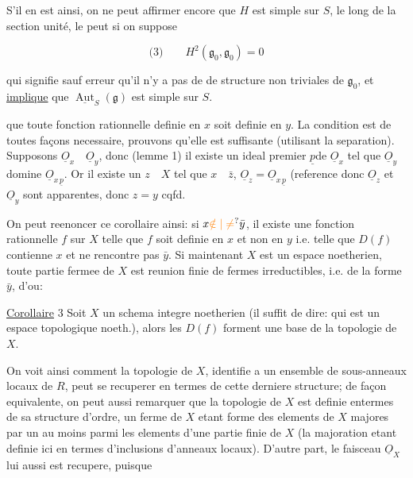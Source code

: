 S'il en est ainsi, on ne peut affirmer encore que \(H\) est simple sur \(S\), \unsure{\(=\)|\(\simeq\)} le long de la section unité,   le peut si on suppose

\[
\text{(3)}\qquad H^2(\mathfrak g_0,\mathfrak g_0)=0
\]

qui signifie sauf erreur qu'il n'y a pas de  de structure  non triviales de \(\mathfrak g_0\), et \uline{implique} que  \(\underline{\operatorname{Aut}}_S(\mathfrak g)\) est simple sur \(S\).

que toute fonction rationnelle definie en \(x\) soit definie en \(y\).  La condition est de toutes façons necessaire, prouvons qu'elle est suffisante (utilisant la separation). Supposons \(\underline O_x\quad\underline O_y\), donc (lemme 1) il existe un ideal premier \(\underline p\)de \(\underline O_x\) tel que \(\underline O_y\) domine \(\underline O_{x\,\underline p}\). Or il existe un \(z\quad X\) tel que \(x\quad\bar z\), \(\underline O_z=\underline O_{x\,\underline p}\) (reference
donc \(\underline O_z\) et \(\underline O_y\) sont apparentes, donc \(z=y\) cqfd.

On peut reenoncer ce corollaire ainsi: si \(x\unsure{\notin|\ne}\bar y\), il existe une fonction rationnelle \(f\) sur \(X\) telle que \(f\) soit definie en \(x\) et non en \(y\) i.e. telle que \(D(f)\) contienne \(x\) et ne rencontre pas \(\bar y\). Si maintenant \(X\) est un espace noetherien, toute partie fermee de \(X\) est reunion finie de fermes irreductibles, i.e. de la forme \(\bar y\), d'ou:

\uline{Corollaire} 3 Soit \(X\) un schema integre noetherien (il suffit de dire: qui est un espace topologique noeth.), alors les \(D(f)\) forment une base de la topologie de \(X\).

On voit ainsi comment la topologie de \(X\), identifie a un ensemble de sous-anneaux locaux de \(R\), peut se recuperer en termes de cette derniere structure; de façon equivalente, on peut aussi remarquer que la topologie de \(X\) est definie entermes de sa structure d'ordre, un ferme de \(X\) etant forme des elements de \(X\) majores par un au moins parmi les elements d'une partie finie de \(X\) (la majoration etant definie  ici en termes d'inclusions  d'anneaux locaux). D'autre part, le faisceau \(\underline O_X\) lui aussi est recupere, puisque

